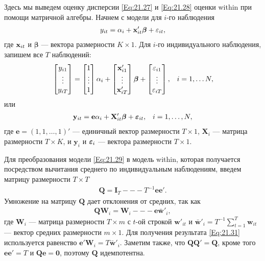 Здесь мы  выведем оценку дисперсии \ref{Eq:21.27} и \ref{Eq:21.28} оценки within при помощи матричной алгебры. Начнем с модели для $i$-го наблюдения
\begin{align}
y_{it}=\alpha_i+\mathbf{x}'_{it}\bm\beta+\varepsilon_{it},
\nonumber
\end{align}
где $\mathbf{x}_{it}$ и $\bm\beta$ --- вектора размерности $K \times 1$. Для $i$-го индивидуального наблюдения, запишем все $T$ наблюдений:
\begin{align}
&\begin{bmatrix}
 y_{i1} \\
 \vdots \\
 y_{iT}
\end{bmatrix}
=
\begin{bmatrix}
1 \\ \vdots  \\ 1
\end{bmatrix}
\alpha_i + 
\begin{bmatrix}
\mathbf{x}'_{i1} \\ \vdots \\  \mathbf{x}'_{iT} 
\end{bmatrix}
 \bm\beta + 
\begin{bmatrix}
 \varepsilon_{i1} \\ \vdots \\ \varepsilon_{iT} 
\end{bmatrix}
, & i=1, \dots N,
\nonumber
\end{align}
или
\begin{align}
& \mathbf y_{it}=\mathbf e \alpha_i+\mathbf X'_{it}\bm\beta+\bm{\varepsilon}_{it},
& i=1, \dots, N,
\label{Eq:21.29}
\end{align}
где $\mathbf e=(1,1, \dots, 1)'$  --- единичный  вектор размерности $T \times 1$, $\mathbf X_i$  --- матрица размерности $T \times K$, и $\mathbf y_i$ и $\bm{\varepsilon}_i$ --- вектора размерности $T \times 1$.

Для преобразования модели \ref{Eq:21.29} в модель within, которая получается посредством вычитания среднего по индивидуальным наблюдениям, введем матрицу размерности $T \times T$
\begin{align}
\mathbf Q=\mathbf I_T --- T^{-1} \mathbf e \mathbf e'.
\label{Eq:21.30}
\end{align}
Умножение на матрицу $\mathbf Q$ дает отклонения от средних, так как
\begin{align}
\mathbf Q \mathbf W_i= \mathbf  W_i --- \mathbf e \bar{\mathbf w}'_i,
\label{Eq:21.31}
\end{align}
где $\mathbf W_i$ --- матрица размерности $T \times m$ с $t$-ой строкой $\mathbf w'_{it}$ и $\bar{\mathbf w}'_i=T^{-1} \sum^T_{t=1} \mathbf w_{it}$ --- вектор средних размерности $m \times 1$. Для получения результата \ref{Eq:21.31} используется равенство $\mathbf e' \mathbf W_i=T\bar{\mathbf w}'_i$. Заметим также, что $\mathbf Q\mathbf Q'=\mathbf Q$, кроме того $\mathbf e \mathbf e'=T$ и $\mathbf Q \mathbf e =\mathbf 0$,  поэтому $\mathbf Q$ идемпотентна.

